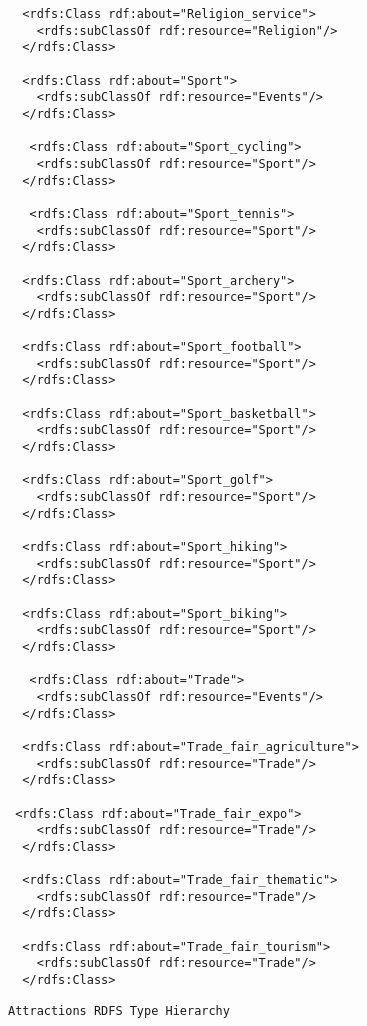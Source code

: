 \begin{verbatim}
  <rdfs:Class rdf:about="Religion_service">
    <rdfs:subClassOf rdf:resource="Religion"/>
  </rdfs:Class>						
				  
  <rdfs:Class rdf:about="Sport">
    <rdfs:subClassOf rdf:resource="Events"/>
  </rdfs:Class>
  
   <rdfs:Class rdf:about="Sport_cycling">
    <rdfs:subClassOf rdf:resource="Sport"/>
  </rdfs:Class>
  
   <rdfs:Class rdf:about="Sport_tennis">
    <rdfs:subClassOf rdf:resource="Sport"/>
  </rdfs:Class>
  
  <rdfs:Class rdf:about="Sport_archery">
    <rdfs:subClassOf rdf:resource="Sport"/>
  </rdfs:Class>
  
  <rdfs:Class rdf:about="Sport_football">
    <rdfs:subClassOf rdf:resource="Sport"/>
  </rdfs:Class>
  
  <rdfs:Class rdf:about="Sport_basketball">
    <rdfs:subClassOf rdf:resource="Sport"/>
  </rdfs:Class>
  
  <rdfs:Class rdf:about="Sport_golf">
    <rdfs:subClassOf rdf:resource="Sport"/>
  </rdfs:Class>
  
  <rdfs:Class rdf:about="Sport_hiking">
    <rdfs:subClassOf rdf:resource="Sport"/>
  </rdfs:Class>
  
  <rdfs:Class rdf:about="Sport_biking">
    <rdfs:subClassOf rdf:resource="Sport"/>
  </rdfs:Class>
  
   <rdfs:Class rdf:about="Trade">
    <rdfs:subClassOf rdf:resource="Events"/>
  </rdfs:Class>
  
  <rdfs:Class rdf:about="Trade_fair_agriculture">
    <rdfs:subClassOf rdf:resource="Trade"/>
  </rdfs:Class>
  
 <rdfs:Class rdf:about="Trade_fair_expo">
    <rdfs:subClassOf rdf:resource="Trade"/>
  </rdfs:Class>
  
  <rdfs:Class rdf:about="Trade_fair_thematic">
    <rdfs:subClassOf rdf:resource="Trade"/>
  </rdfs:Class>
  
  <rdfs:Class rdf:about="Trade_fair_tourism">
    <rdfs:subClassOf rdf:resource="Trade"/>
  </rdfs:Class> 
\end{verbatim}
\vspace{-0.25in}
\footnotesize
\begin{verbatim}
Attractions RDFS Type Hierarchy 
\end{verbatim}
\vspace{-0.25in}
